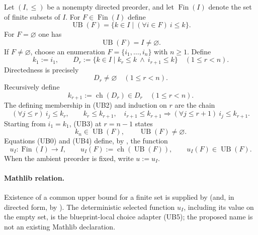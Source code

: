 \begin{definition}
  \label{def:nagata-directed-finite-upper-bound}
  \lean{}

  Let $(I,\leq)$ be a nonempty directed preorder, and let
  $\operatorname{Fin}(I)$ denote the set of finite subsets of $I$.  For
  $F\in\operatorname{Fin}(I)$ define
  \[
    \operatorname{UB}(F)
      =\{k\in I\mid (\forall i\in F)\ i\leq k\}.
  \]
  For $F=\varnothing$ one has
  \[
    \operatorname{UB}(F)=I\neq\varnothing.                       \tag{UB0}
  \]
  If $F\neq\varnothing$, choose an enumeration
  $F=\{i_1,\ldots,i_n\}$ with $n\geq1$.  Define
  \[
    k_1:=i_1,\qquad
    D_r:=\{k\in I\mid k_r\leq k\ \wedge\ i_{r+1}\leq k\}
      \quad(1\leq r<n).                                          \tag{UB1}
  \]
  Directedness is precisely
  \[
    D_r\neq\varnothing\quad(1\leq r<n).
  \]
  Recursively define
  \[
    k_{r+1}:=\operatorname{ch}(D_r)\in D_r
      \quad(1\leq r<n).                                          \tag{UB2}
  \]
  The defining membership in (UB2) and induction on $r$ are the chain
  \[
    (\forall j\leq r)\ i_j\leq k_r,\qquad
    k_r\leq k_{r+1},\quad i_{r+1}\leq k_{r+1}
      \Longrightarrow
    (\forall j\leq r+1)\ i_j\leq k_{r+1}.                       \tag{UB3}
  \]
  Starting from $i_1=k_1$, (UB3) at $r=n-1$ states
  \[
    k_n\in\operatorname{UB}(F),\qquad
    \operatorname{UB}(F)\neq\varnothing.                        \tag{UB4}
  \]
  Equations (UB0) and (UB4) define, by
  , the function
  \[
    u_I\colon\operatorname{Fin}(I)\longrightarrow I,
    \qquad
    u_I(F):=\operatorname{ch}(\operatorname{UB}(F)),
    \qquad
    u_I(F)\in\operatorname{UB}(F).                               \tag{UB5}
  \]
  When the ambient preorder is fixed, write $u:=u_I$.

  \paragraph{Mathlib relation.}
  Existence of a common upper bound for a finite set is supplied by
  \texttt{} (and, in directed form, by
  \texttt{}).  The deterministic selected
  function $u_I$, including its value on the empty set, is the
  blueprint-local choice adapter (UB5); the proposed name
  \texttt{} is not an existing
  Mathlib declaration.
\end{definition}

